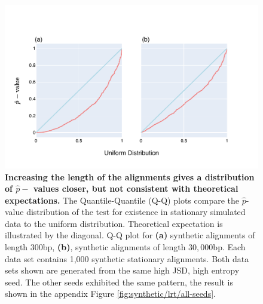 \begin{figure}[htbp]
\centering
\includegraphics[width=\textwidth]{figures/plots/synthetic/lrt/197113_332182_17210-long_seq.pdf}
\caption{\textbf{Increasing the length of the alignments gives a distribution of $\hat p-$ values closer, but not consistent with theoretical expectations.} The Quantile-Quantile (Q-Q) plots compare the $\hat p$-value distribution of the test for existence in stationary simulated data to the uniform distribution. Theoretical expectation is illustrated by the diagonal. Q-Q plot for \textbf{(a)} synthetic alignments of length $300$bp, \textbf{(b)}, synthetic alignments of length $30,000$bp. Each data set contains 1,000 synthetic stationary alignments. Both data sets shown are generated from the same high JSD, high entropy seed. The other seeds exhibited the same pattern, the result is shown in the appendix Figure \ref{fig:synthetic/lrt/all-seeds}.}
\label{fig:synthetic/lrt/197113-long_seq}
\end{figure}
